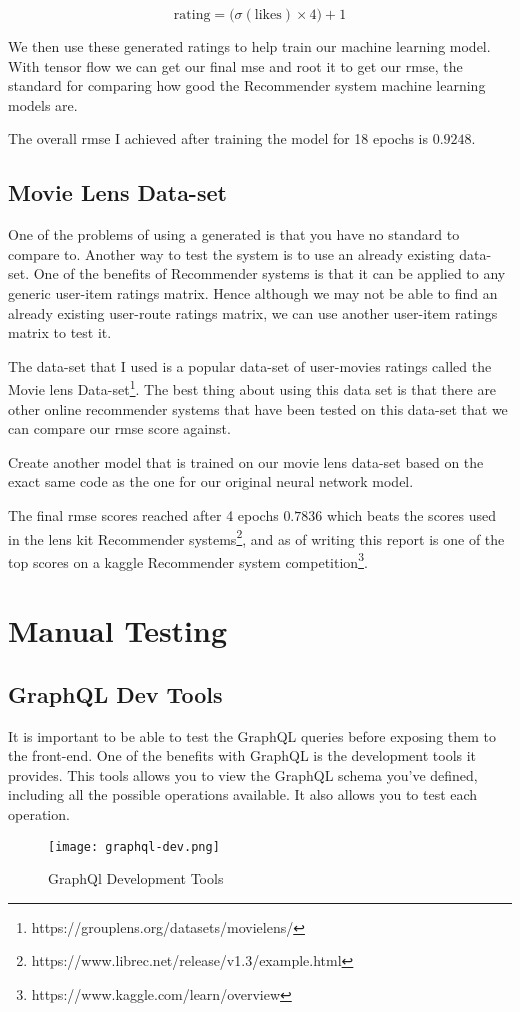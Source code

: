 \begin{equation} \label{eqn:RatingCalculation}
    \textrm{rating} = \big(\sigma(\textrm{likes}) \times 4\big) + 1
\end{equation}

We then use these generated ratings to help train our machine learning model. With tensor flow we can get our final \acrshort{mse} and root it to get our \acrfull{rmse}, the standard for comparing how good the Recommender system machine learning models are.

The overall \acrshort{rmse} I achieved after training the model for 18 epochs is $0.9248$.

\subsection{Movie Lens Data-set}
One of the problems of using a generated is that you have no standard to compare to. Another way to test the system is to use an already existing data-set. One of the benefits of Recommender systems is that it can be applied to any generic user-item ratings matrix. Hence although we may not be able to find an already existing user-route ratings matrix, we can use another user-item ratings matrix to test it.

The data-set that I used is a popular data-set of user-movies ratings called the Movie lens Data-set\footnote{https://grouplens.org/datasets/movielens/}. The best thing about using this data set is that there are other online recommender systems that have been tested on this data-set that we can compare our \acrshort{rmse} score against.

Create another model that is trained on our movie lens data-set based on the exact same code as the one for our original neural network model.

The final \acrshort{rmse} scores reached after 4 epochs $0.7836$ which beats the scores used in the lens kit Recommender systems\footnote{https://www.librec.net/release/v1.3/example.html}, and as of writing this report is one of the top scores on a kaggle Recommender system competition\footnote{https://www.kaggle.com/learn/overview}.
\section{Manual Testing}

\subsection{GraphQL Dev Tools}
It is important to be able to test the GraphQL queries before exposing them to the front-end. One of the benefits with GraphQL is the development tools it provides. This tools allows you to view the GraphQL schema you've defined, including all the possible operations available. It also allows you to test each operation.
\begin{figure}[ht]
    \centering
    \texttt{[image: graphql-dev.png]}
    \caption{GraphQl Development Tools}
    \label{fig:graphQLDevTools}
\end{figure}

